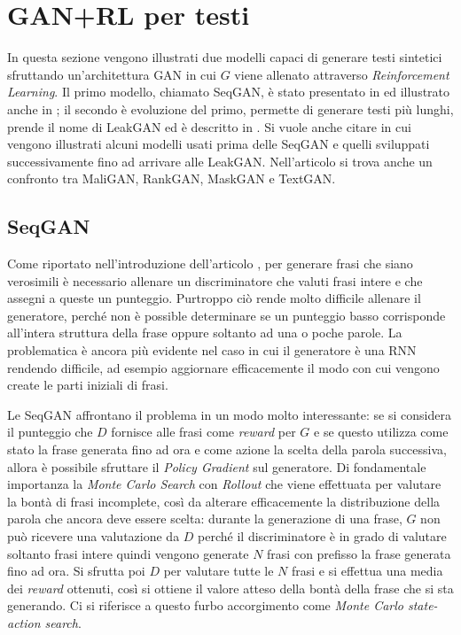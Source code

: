 

\section{GAN+RL per testi}
In questa sezione vengono illustrati due modelli capaci di generare testi sintetici sfruttando un'architettura GAN in cui $G$ viene allenato attraverso \emph{Reinforcement Learning}.
Il primo modello, chiamato SeqGAN, è stato presentato in \cite{SeqGAN} ed illustrato anche in \cite{GAN_for_text}; il secondo è evoluzione del primo, permette di generare testi più lunghi, prende il nome di LeakGAN ed è descritto in \cite{LeakGAN}.
Si vuole anche citare \cite{NetTextGen_Review} in cui vengono illustrati alcuni modelli usati prima delle SeqGAN e quelli sviluppati successivamente fino ad arrivare alle LeakGAN.
Nell'articolo si trova anche un confronto tra MaliGAN, RankGAN, MaskGAN e TextGAN.

\subsection{SeqGAN}
Come riportato nell'introduzione dell'articolo \cite{SeqGAN}, per generare frasi che siano verosimili è necessario allenare un discriminatore che valuti frasi intere e che assegni a queste un punteggio.
Purtroppo ciò rende molto difficile allenare il generatore, perché non è possible determinare se un punteggio basso corrisponde all'intera struttura della frase oppure soltanto ad una o poche parole.
La problematica è ancora più evidente nel caso in cui il generatore è una RNN 
rendendo difficile, ad esempio aggiornare efficacemente il modo con cui vengono create le parti iniziali di frasi.

Le SeqGAN affrontano il problema in un modo molto interessante: se si considera il punteggio che $D$ fornisce alle frasi come \emph{reward} per $G$ e se questo utilizza come stato la frase generata fino ad ora e come azione la scelta della parola successiva, allora è possibile sfruttare il \emph{Policy Gradient} sul generatore.
Di fondamentale importanza la \emph{Monte Carlo Search} con \emph{Rollout} che viene effettuata per valutare la bontà di frasi incomplete, così da alterare efficacemente la distribuzione della parola che ancora deve essere scelta: 
durante la generazione di una frase, $G$ non può ricevere una valutazione da $D$ perché il discriminatore è in grado di valutare soltanto frasi intere %
quindi vengono generate $N$ frasi con prefisso la frase generata fino ad ora.
Si sfrutta poi $D$ per valutare tutte le $N$ frasi e si effettua una media dei \emph{reward} ottenuti, così si ottiene il valore atteso della bontà della frase che si sta generando.
Ci si riferisce a questo furbo accorgimento come \emph{Monte Carlo state-action search}.

